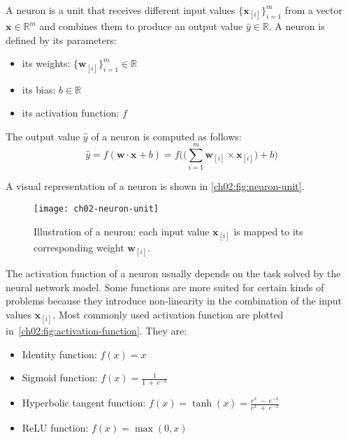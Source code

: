     \theoremstyle{definition}
    \begin{definition}[A neuron]
      A neuron is a unit that receives different input values
      $\{\mathbf{x}_{[i]}\}_{i = 1}^m$ from a vector $\mathbf{x} \in
      \mathbb{R}^m$ and combines them to produce an output value $\hat{y} \in
      \mathbb{R}$. A neuron is defined by its parameters:
      \begin{itemize}
        \item its weights: $\{\mathbf{w}_{[i]}\}_{i = 1}^m \in \mathbb{R}$
        \item its bias: $b \in \mathbb{R}$
        \item its activation function: $f$
      \end{itemize}
      The output value $\hat{y}$ of a neuron is computed as follows:
      \begin{equation}
        \hat{y} = f(\mathbf{w} \cdot \mathbf{x} + b)
                = f\Big(
                \big(\sum_{i=1}^m \mathbf{w}_{[i]} \times \mathbf{x}_{[i]}\big)
                + b\Big)
      \end{equation}
    \end{definition}

    \noindent A visual representation of a neuron is shown in
    \autoref{ch02:fig:neuron-unit}.

    \begin{figure}[h!]
      \centering
      \texttt{[image: ch02-neuron-unit]}
      \caption[Illustration of a neuron.]
      {Illustration of a neuron: each input value $\mathbf{x}_{[i]}$ is mapped
      to its corresponding weight $\mathbf{w}_{[i]}$.}
      \label{ch02:fig:neuron-unit}
    \end{figure}

    \pagebreak
    The activation function of a neuron usually depends on the task
    solved by the neural network model. Some functions are more suited for
    certain kinds of problems because they introduce non-linearity in the
    combination of the input values $\mathbf{x}_{[i]}$. Most commonly used
    activation function are plotted in~\autoref{ch02:fig:activation-function}.
    They are:
    \begin{itemize}
      \item Identity function: $f(x) = x$
      \item Sigmoid function: $f(x) = \frac{1}{1~+~e^{-x}}$
      \item Hyperbolic tangent function:
        $f(x) = \tanh(x) = \frac{e^x~-~e^{-x}}{e^x~+~e^{-x}}$
      \item ReLU function: $f(x) = \max(0, x)$
    \end{itemize}

